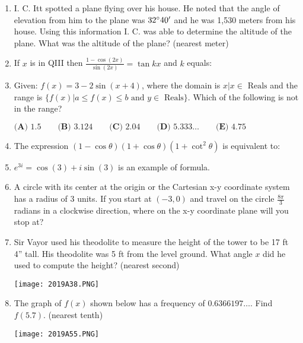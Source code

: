 \documentclass[../uilmath.tex]{subfiles}
\begin{document}
\begin{enumerate}[label=\bfseries\arabic*.]
    \item %
    I. C. Itt spotted a plane flying over his house. He noted that the angle of elevation from him to the plane was $32\degree 40'$ and he was 1,530 meters from his house.
    Using this information I. C. was able to determine the altitude of the plane. What was the altitude of the plane? (nearest meter)

    \item %
    If $x$ is in QIII then $\frac{1-\cos(2x)}{\sin(2x)} = \tan kx$ and $k$ equals: 

    \item %
    Given: $f(x)=3-2\sin(x+4)$, where the domain is ${x|x\in \text{ Reals}}$ and the range is 
    $\{f(x)|a\leq f(x)\leq b \text{ and } y\in \text{ Reals}\}$. Which of the following is not in the range?

    $\textbf{(A) } 1.5 \qquad \textbf{(B) } 3.124 \qquad \textbf{(C) } 2.04 \qquad \textbf{(D) } 5.333\dots \qquad \textbf{(E) }4.75$

    \item %
    The expression $(1-\cos\theta)(1+\cos\theta)(1+\cot^2\theta)$ is equivalent to:

    \item %
    $e^{3i}=\cos(3)+i\sin(3)$ is an example of \blank formula.

    \item %
    A circle with its center at the origin or the Cartesian x-y coordinate system has a radius of 3 units.
    If you start at $(-3,0)$ and travel on the circle $\frac{8\pi}{3}$ radians in a clockwise direction, where on the x-y coordinate plane will you stop at?

    \item %
    Sir Vayor used his theodolite to measure the height of the tower to be 17 ft 4'' tall. His theodolite was 5 ft from the level ground.
    What angle $x$ did he used to compute the height? (nearest second)
    \begin{center}
        \texttt{[image: 2019A38.PNG]}
    \end{center}

    \item %
    The graph of $f(x)$ shown below has a frequency of $0.6366197\dots$. Find $f(5.7)$. (nearest tenth)
    \begin{center}
        \texttt{[image: 2019A55.PNG]}
    \end{center}


\end{enumerate}
\end{document}
